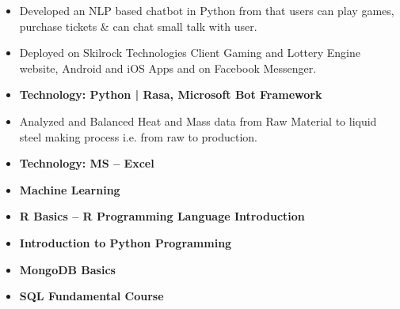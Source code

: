 \documentclass[10pt,a4paper,ragged2e]{altacv}
\begin{document}
\begin{itemize}
\item Developed an NLP based chatbot in Python from that users can play games, purchase tickets \& can chat small talk with user.
\item Deployed on Skilrock Technologies Client Gaming and Lottery Engine website, Android and iOS Apps and on Facebook Messenger.
\item\bf{Technology}{: Python | Rasa, Microsoft Bot Framework}
\end{itemize}

\divider

\begin{itemize}
\item Analyzed and Balanced Heat and Mass data from Raw Material to liquid steel making process i.e. from raw to production.
\smallskip
\item\bf{Technology}{: MS -- Excel}
\end{itemize}


\begin{itemize}
    \item\bf{Machine Learning}
    \item\bf{R Basics – R Programming Language Introduction}
    \item\bf{Introduction to Python Programming}
    \item\bf{MongoDB Basics}
    \item\bf{SQL Fundamental Course}
\end{itemize}
\end{document}
